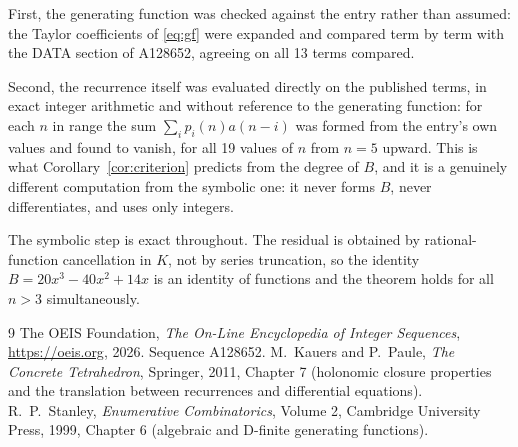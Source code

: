 \documentclass[11pt,a4paper]{article}
\theoremstyle{plain}
\theoremstyle{definition}
\begin{document}
First, the generating function was checked against the entry rather than assumed: the
Taylor coefficients of \eqref{eq:gf} were expanded and compared term by term with the DATA
section of A128652, agreeing on all 13 terms compared.

Second, the recurrence itself was evaluated directly on the published terms, in exact
integer arithmetic and without reference to the generating function: for each $n$ in range
the sum $\sum_{i}p_{i}(n)a(n-i)$ was formed from the entry's own values and found to
vanish, for all 19 values of $n$ from $n=5$ upward. This is what
Corollary~\ref{cor:criterion} predicts from the degree of $B$, and it is a genuinely
different computation from the symbolic one: it never forms $B$, never differentiates, and
uses only integers.

The symbolic step is exact throughout. The residual is obtained by rational-function
cancellation in $K$, not by series truncation, so the identity $B=20 x^{3} - 40 x^{2} + 14 x$ is an
identity of functions and the theorem holds for all $n>3$ simultaneously.

\begin{thebibliography}{9}
 The OEIS Foundation, \emph{The On-Line Encyclopedia of Integer Sequences},
\url{https://oeis.org}, 2026. Sequence A128652.
 M.~Kauers and P.~Paule, \emph{The Concrete Tetrahedron}, Springer, 2011,
Chapter 7 (holonomic closure properties and the translation between recurrences and
differential equations).
 R.~P.~Stanley, \emph{Enumerative Combinatorics}, Volume 2, Cambridge
University Press, 1999, Chapter 6 (algebraic and D-finite generating functions).
\end{thebibliography}
\end{document}
